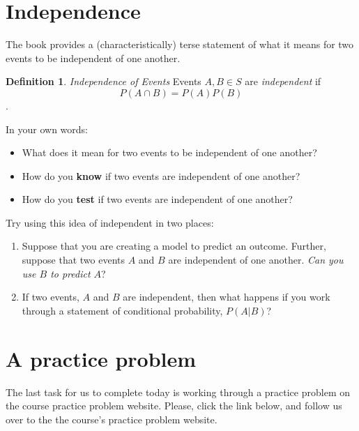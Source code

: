 \documentclass[
]{book}
\providecommand{\tightlist}{%
  \setlength{\itemsep}{0pt}\setlength{\parskip}{0pt}}
\theoremstyle{definition}
\newtheorem{definition}{Definition}[chapter]
\theoremstyle{definition}
\theoremstyle{definition}
\theoremstyle{definition}
\theoremstyle{remark}
\begin{document}
\vspace{5cm}

\hypertarget{independence}{%
\section{Independence}\label{independence}}

The book provides a (characteristically) terse statement of what it means for two events to be independent of one another.

\begin{definition}
\emph{Independence of Events} Events \(A, B \in S\) are \emph{independent} if \[P(A \cap B) = P(A)P(B)\].
\end{definition}

In your own words:

\begin{itemize}
\tightlist
\item
  What does it mean for two events to be independent of one another?
\item
  How do you \textbf{know} if two events are independent of one another?
\item
  How do you \textbf{test} if two events are independent of one another?
\end{itemize}

Try using this idea of independent in two places:

\begin{enumerate}
\def\labelenumi{\arabic{enumi}.}
\tightlist
\item
  Suppose that you are creating a model to predict an outcome. Further, suppose that two events \(A\) and \(B\) are independent of one another. \emph{Can you use \(B\) to predict \(A\)}?
\item
  If two events, \(A\) and \(B\) are independent, then what happens if you work through a statement of conditional probability, \(P(A|B)\)?
\end{enumerate}

\hypertarget{a-practice-problem}{%
\section{A practice problem}\label{a-practice-problem}}

The last task for us to complete today is working through a practice problem on the course practice problem website. Please, click the link below, and follow us over to the the course's practice problem website.
\end{document}

